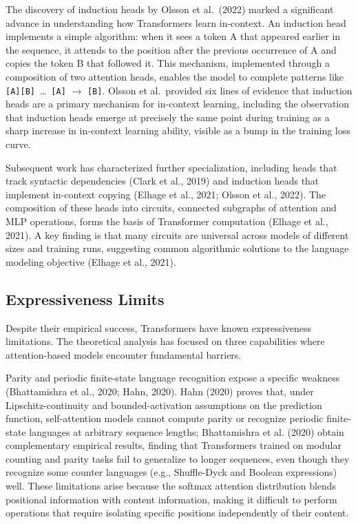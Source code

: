 \documentclass[10pt,twocolumn]{article}
\begin{document}
The discovery of induction heads by Olsson et al.~(2022) marked a significant advance in understanding how Transformers learn in-context. An induction head implements a simple algorithm: when it sees a token A that appeared earlier in the sequence, it attends to the position after the previous occurrence of A and copies the token B that followed it. This mechanism, implemented through a composition of two attention heads, enables the model to complete patterns like \texttt{[A][B]}~\ldots{}~\texttt{[A]} $\to$ \texttt{[B]}. Olsson et al.~provided six lines of evidence that induction heads are a primary mechanism for in-context learning, including the observation that induction heads emerge at precisely the same point during training as a sharp increase in in-context learning ability, visible as a bump in the training loss curve.

Subsequent work has characterized further specialization, including heads that track syntactic dependencies (Clark et al., 2019) and induction heads that implement in-context copying (Elhage et al., 2021; Olsson et al., 2022). The composition of these heads into circuits, connected subgraphs of attention and MLP operations, forms the basis of Transformer computation (Elhage et al., 2021). A key finding is that many circuits are universal across models of different sizes and training runs, suggesting common algorithmic solutions to the language modeling objective (Elhage et al., 2021).

\subsection{Expressiveness Limits}\label{expressiveness-limits}

Despite their empirical success, Transformers have known expressiveness limitations. The theoretical analysis has focused on three capabilities where attention-based models encounter fundamental barriers.

Parity and periodic finite-state language recognition expose a specific weakness (Bhattamishra et al., 2020; Hahn, 2020). Hahn (2020) proves that, under Lipschitz-continuity and bounded-activation assumptions on the prediction function, self-attention models cannot compute parity or recognize periodic finite-state languages at arbitrary sequence lengths; Bhattamishra et al. (2020) obtain complementary empirical results, finding that Transformers trained on modular counting and parity tasks fail to generalize to longer sequences, even though they recognize some counter languages (e.g., Shuffle-Dyck and Boolean expressions) well. These limitations arise because the softmax attention distribution blends positional information with content information, making it difficult to perform operations that require isolating specific positions independently of their content.
\end{document}
